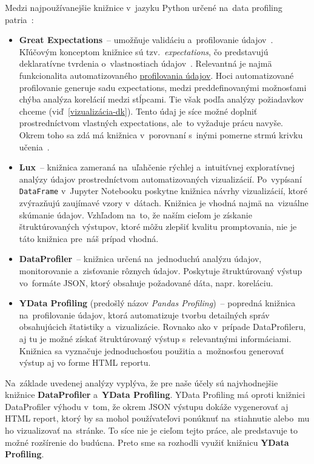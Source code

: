 Medzi najpoužívanejšie knižnice v~jazyku Python určené na~data profiling patria~\cite{data-profiling-packages}:

\begin{itemize}
\item \textbf{Great Expectations}~-- umožňuje validáciu a~profilovanie údajov~\cite{great-expectations}. Kľúčovým konceptom knižnice sú tzv.~\textit{expectations}, čo predstavujú deklaratívne tvrdenia o~vlastnostiach údajov~\cite{expectations}. Relevantná je najmä funkcionalita automatizovaného \href{https://legacy.017.docs.greatexpectations.io/docs/0.15.50/#automated-data-profiling}{profilovania údajov}. Hoci automatizované profilovanie generuje sadu expectations, medzi preddefinovanými možnosťami chýba analýza korelácií medzi stĺpcami. Tie však podľa analýzy požiadavkov chceme (viď~\ref{vizualizácia-dk}). Tento údaj je síce možné doplniť prostredníctvom vlastných expectations, ale~to vyžaduje prácu navyše. Okrem toho sa zdá má knižnica v~porovnaní s~inými pomerne strmú krivku učenia~\cite{learning-curve}.

\item \textbf{Lux}~-- knižnica zameraná na~uľahčenie rýchlej a~intuitívnej exploratívnej analýzy údajov prostredníctvom automatizovaných vizualizácií. Po~vypísaní \texttt{DataFrame} v~Jupyter Notebooku poskytne knižnica návrhy vizualizácií, ktoré zvýrazňujú zaujímavé vzory v~dátach. Knižnica je vhodná najmä na~vizuálne skúmanie údajov. Vzhľadom na~to, že naším cieľom je získanie štruktúrovaných výstupov, ktoré môžu zlepšiť kvalitu promptovania, nie je táto knižnica pre~náš prípad vhodná.

\item \textbf{DataProfiler}~-- knižnica určená na~jednoduchú analýzu údajov, monitorovanie a~zisťovanie rôznych údajov. Poskytuje štruktúrovaný výstup vo~formáte JSON, ktorý obsahuje požadované dáta, napr. koreláciu.

\item \textbf{YData Profiling} (predošlý názov \textit{Pandas Profiling})~-- popredná knižnica na~profilovanie údajov, ktorá automatizuje tvorbu detailných správ obsahujúcich štatistiky a~vizualizácie. Rovnako ako v~prípade DataProfileru, aj tu je možné získať štruktúrovaný výstup s~relevantnými informáciami. Knižnica sa vyznačuje jednoduchosťou použitia a~možnosťou generovať výstup aj vo forme HTML reportu.
\end{itemize}

Na~základe uvedenej analýzy vyplýva, že pre naše účely sú najvhodnejšie knižnice \textbf{DataProfiler} a~\textbf{YData Profiling}. YData Profiling má oproti knižnici DataProfiler výhodu v~tom, že okrem JSON výstupu dokáže vygenerovať aj HTML report, ktorý by sa mohol používateľovi ponúknuť na~stiahnutie alebo~mu ho vizualizovať na~stránke. To síce nie je cieľom tejto práce, ale predstavuje to možné rozšírenie do budúcna. Preto sme sa rozhodli využiť knižnicu \textbf{YData Profiling}.

